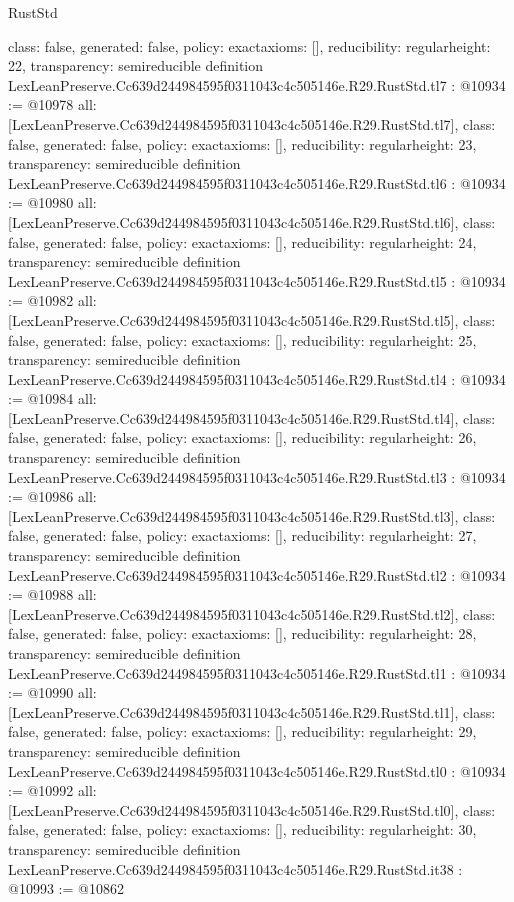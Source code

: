 \begin{lexlean}{RustStd}
\begin{coremodule}
{  class: false,
  generated: false,
  policy: exact{axioms: []},
  reducibility: regular{height: 22},
  transparency: semireducible
}
definition LexLeanPreserve.Cc639d244984595f0311043c4c505146e.R29.RustStd.tl7 : @10934 := @10978 {
  all: [LexLeanPreserve.Cc639d244984595f0311043c4c505146e.R29.RustStd.tl7],
  class: false,
  generated: false,
  policy: exact{axioms: []},
  reducibility: regular{height: 23},
  transparency: semireducible
}
definition LexLeanPreserve.Cc639d244984595f0311043c4c505146e.R29.RustStd.tl6 : @10934 := @10980 {
  all: [LexLeanPreserve.Cc639d244984595f0311043c4c505146e.R29.RustStd.tl6],
  class: false,
  generated: false,
  policy: exact{axioms: []},
  reducibility: regular{height: 24},
  transparency: semireducible
}
definition LexLeanPreserve.Cc639d244984595f0311043c4c505146e.R29.RustStd.tl5 : @10934 := @10982 {
  all: [LexLeanPreserve.Cc639d244984595f0311043c4c505146e.R29.RustStd.tl5],
  class: false,
  generated: false,
  policy: exact{axioms: []},
  reducibility: regular{height: 25},
  transparency: semireducible
}
definition LexLeanPreserve.Cc639d244984595f0311043c4c505146e.R29.RustStd.tl4 : @10934 := @10984 {
  all: [LexLeanPreserve.Cc639d244984595f0311043c4c505146e.R29.RustStd.tl4],
  class: false,
  generated: false,
  policy: exact{axioms: []},
  reducibility: regular{height: 26},
  transparency: semireducible
}
definition LexLeanPreserve.Cc639d244984595f0311043c4c505146e.R29.RustStd.tl3 : @10934 := @10986 {
  all: [LexLeanPreserve.Cc639d244984595f0311043c4c505146e.R29.RustStd.tl3],
  class: false,
  generated: false,
  policy: exact{axioms: []},
  reducibility: regular{height: 27},
  transparency: semireducible
}
definition LexLeanPreserve.Cc639d244984595f0311043c4c505146e.R29.RustStd.tl2 : @10934 := @10988 {
  all: [LexLeanPreserve.Cc639d244984595f0311043c4c505146e.R29.RustStd.tl2],
  class: false,
  generated: false,
  policy: exact{axioms: []},
  reducibility: regular{height: 28},
  transparency: semireducible
}
definition LexLeanPreserve.Cc639d244984595f0311043c4c505146e.R29.RustStd.tl1 : @10934 := @10990 {
  all: [LexLeanPreserve.Cc639d244984595f0311043c4c505146e.R29.RustStd.tl1],
  class: false,
  generated: false,
  policy: exact{axioms: []},
  reducibility: regular{height: 29},
  transparency: semireducible
}
definition LexLeanPreserve.Cc639d244984595f0311043c4c505146e.R29.RustStd.tl0 : @10934 := @10992 {
  all: [LexLeanPreserve.Cc639d244984595f0311043c4c505146e.R29.RustStd.tl0],
  class: false,
  generated: false,
  policy: exact{axioms: []},
  reducibility: regular{height: 30},
  transparency: semireducible
}
definition LexLeanPreserve.Cc639d244984595f0311043c4c505146e.R29.RustStd.it38 : @10993 := @10862 {
}
\end{coremodule}
\end{lexlean}
